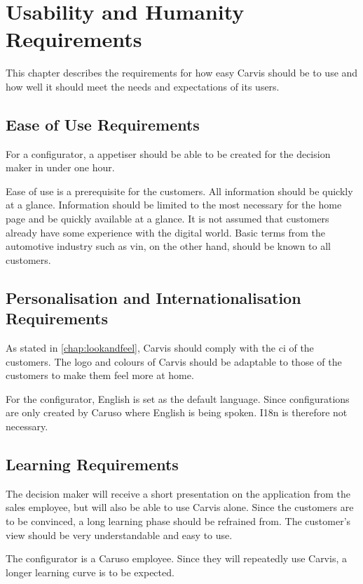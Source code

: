 \chapter{Usability and Humanity Requirements}
This chapter describes the requirements for how easy Carvis should be to use and how well it should meet the needs and expectations of its users.

\section{Ease of Use Requirements}
For a configurator, a \gls{appetiser} should be able to be created for the decision maker in under one hour. 

Ease of use is a prerequisite for the customers. All information should be quickly at a glance. 
Information should be limited to the most necessary for the home page and be quickly available at a glance.
It is not assumed that customers already have some experience with the digital world. 
Basic terms from the automotive industry such as \gls{vin}, on the other hand, should be known to all customers.

\section{Personalisation and Internationalisation Requirements}
As stated in \autoref{chap:lookandfeel}, Carvis should comply with the \gls{ci} of the customers. The logo and colours of Carvis should be adaptable to those of the customers to make them feel more at home.

For the configurator, English is set as the default language. Since configurations are only created by Caruso where English is being spoken. I18n is therefore not necessary.

\section{Learning Requirements}
The decision maker will receive a short presentation on the application from the sales employee, but will also be able to use Carvis alone. 
Since the customers are to be convinced, a long learning phase should be refrained from.
The customer's view should be very understandable and easy to use. 

The configurator is a Caruso employee. Since they will repeatedly use Carvis, a longer learning curve is to be expected. 